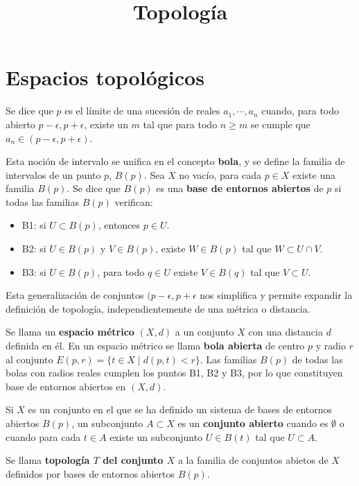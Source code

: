 \documentclass[a4paper, 11pt]{extarticle}
\date{}
\title{\Huge\vspace{-1em}Topología}
\begin{document}
\maketitle
\vspace{-8em}

\section{Espacios topológicos}
\label{sec:orgf2a4b07}
Se dice que \(p\) es el límite de una sucesión de reales \(a_1, \cdots, a_n\) cuando, para todo abierto \(p - \epsilon, p + \epsilon\), existe un \(m\)
tal que para todo \(n \ge m\) se cumple que \(a_n \in (p- \epsilon, p +
\epsilon)\). 

Esta noción de intervalo se unifica en el concepto \textbf{bola}, y se define la familia
de intervalos de un punto \(p\), \(B(p)\). Sea \(X\) no vacío, para cada
\(p \in X\) existe una familia \(B(p)\). Se dice que \(B(p)\) es una \textbf{base
de entornos abiertos} de \(p\) si todas las familias \(B(p)\) verifican:
\begin{itemize}
\item B1: si \(U \subset B(p)\), entonces \(p \in U\).
\item B2: si \(U \in B(p)\) y \(V \in B(p)\), existe \(W \in B(p)\) tal que \(W \subset U \cap V\).
\item B3: si \(U \in B(p)\), para todo \(q \in U\) existe \(V \in B(q)\) tal
que \(V \subset U\).
\end{itemize}

Esta generalización de conjuntos \((p - \epsilon, p+\epsilon\) nos simplifica
y permite expandir la definición de topología, independientemente de una métrica
o distancia.

Se llama un \textbf{espacio métrico} \((X,d)\) a un conjunto \(X\) con una distancia
\(d\) definida en él. En un espacio métrico se llama \textbf{bola abierta} de centro
\(p\) y radio \(r\) al conjunto \(E(p,r) = \{ t \in X \;|\; d(p,t) < r \}\).
Las familias \(B(p)\) de todas las bolas con radios reales cumplen los puntos
B1, B2 y B3, por lo que constituyen base de entornos abiertos en \((X,d)\).

Si \(X\) es un conjunto en el que se ha definido un sistema de bases de
entornos abiertos \(B(p)\), un subconjunto \(A \subset X\) es un \textbf{conjunto abierto} cuando es \(\emptyset\) o cuando para cada \(t \in A\) existe un subconjunto \(U \in B(t)\) tal que \(U \subset A\).

Se llama \textbf{topología \(T\) del conjunto \(X\)} a la familia de conjuntos
abietos de \(X\) definidos por bases de entornos abiertos \(B(p)\).
\end{document}
